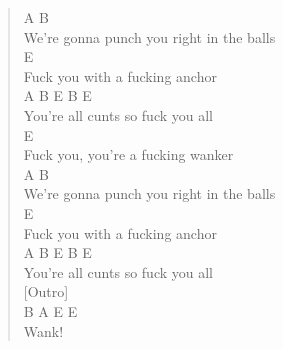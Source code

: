 \documentclass[11pt]{article}
\begin{document}
\begin{verse}
A                      B\\
We're gonna punch you right in the balls\\
E\\
Fuck you with a fucking anchor\\
A           B        E    B   E\\
You're all cunts so fuck you all\\
E\\
Fuck you, you're a fucking wanker\\
A                      B\\
We're gonna punch you right in the balls\\
E\\
Fuck you with a fucking anchor\\
A           B        E    B   E\\
You're all cunts so fuck you all\\
\vspace*{1em}
[Outro]\\
B A E E\\
\hspace*{7em}Wank!\\
\end{verse}
\clearpage
\end{document}
